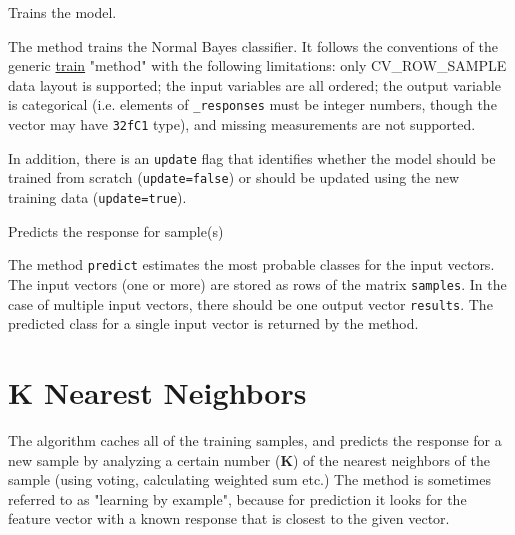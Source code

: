 
Trains the model.


The method trains the Normal Bayes classifier. It follows the conventions of the generic \href{#CvStatModel\_train}{train} "method" with the following limitations: only CV\_ROW\_SAMPLE data layout is supported; the input variables are all ordered; the output variable is categorical (i.e. elements of \texttt{\_responses} must be integer numbers, though the vector may have \texttt{32fC1} type), and missing measurements are not supported.

In addition, there is an \texttt{update} flag that identifies whether the model should be trained from scratch (\texttt{update=false}) or should be updated using the new training data (\texttt{update=true}).


Predicts the response for sample(s)


The method \texttt{predict} estimates the most probable classes for the input vectors. The input vectors (one or more) are stored as rows of the matrix \texttt{samples}. In the case of multiple input vectors, there should be one output vector \texttt{results}. The predicted class for a single input vector is returned by the method.

\section{K Nearest Neighbors}

The algorithm caches all of the training samples, and predicts the response for a new sample by analyzing a certain number (\textbf{K}) of the nearest neighbors of the sample (using voting, calculating weighted sum etc.) The method is sometimes referred to as "learning by example", because for prediction it looks for the feature vector with a known response that is closest to the given vector.


